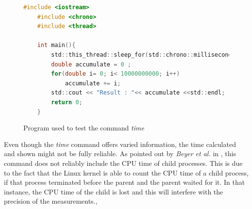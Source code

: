 \begin{figure}[h]
\begin{lstlisting}[language=c]
    #include <iostream>
    #include <chrono>
    #include <thread>
    
    int main(){
        std::this_thread::sleep_for(std::chrono::milliseconds(1000));
        double accumulate = 0 ;
        for(double i= 0; i< 10000000000; i++)
            accumulate += i;
        std::cout << "Result : "<< accumulate <<std::endl;  
        return 0;
    }
\end{lstlisting}
\caption{Program used to test the command \textit{time}}
\label{fig:time_code_cpp}
\end{figure}


Even though the \textit{time} command offers varied information, the time calculated and shown might not be fully reliable. As pointed out by \textit{Beyer et al.} in \cite{Beyer2017ReliableBR}, this command does not reliably include the CPU time of child processes. This is due to the fact that the Linux kernel is able to count the CPU time of a child process, if that process terminated before the parent and the parent waited for it. In that instance, the CPU time of the child is lost and this will interfere with the precision of the measurements.\cite{Beyer2017ReliableBR},\\ \hfill

